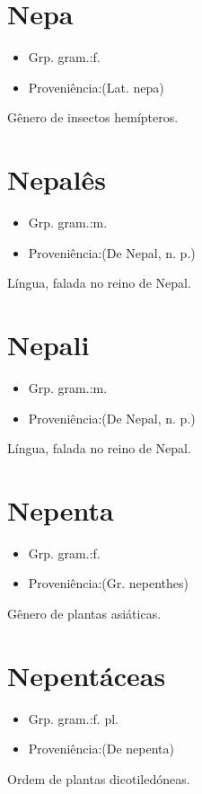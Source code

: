 \section{Nepa}
\begin{itemize}
\item {Grp. gram.:f.}
\end{itemize}
\begin{itemize}
\item {Proveniência:(Lat. \textunderscore nepa\textunderscore )}
\end{itemize}
Gênero de insectos hemípteros.
\section{Nepalês}
\begin{itemize}
\item {Grp. gram.:m.}
\end{itemize}
\begin{itemize}
\item {Proveniência:(De \textunderscore Nepal\textunderscore , n. p.)}
\end{itemize}
Língua, falada no reino de Nepal.
\section{Nepali}
\begin{itemize}
\item {Grp. gram.:m.}
\end{itemize}
\begin{itemize}
\item {Proveniência:(De \textunderscore Nepal\textunderscore , n. p.)}
\end{itemize}
Língua, falada no reino de Nepal.
\section{Nepenta}
\begin{itemize}
\item {Grp. gram.:f.}
\end{itemize}
\begin{itemize}
\item {Proveniência:(Gr. \textunderscore nepenthes\textunderscore )}
\end{itemize}
Gênero de plantas asiáticas.
\section{Nepentáceas}
\begin{itemize}
\item {Grp. gram.:f. pl.}
\end{itemize}
\begin{itemize}
\item {Proveniência:(De \textunderscore nepenta\textunderscore )}
\end{itemize}
Ordem de plantas dicotiledóneas.
